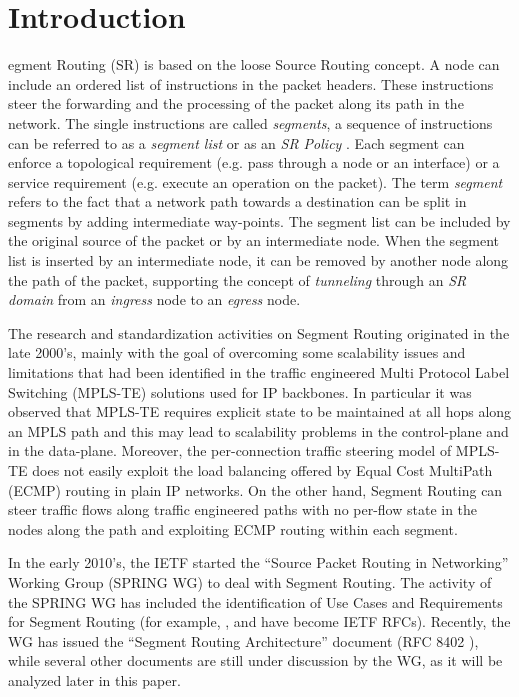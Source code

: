\section{Introduction}
\label{sec:intro}

egment Routing (SR) is based on the loose Source Routing concept. A node can include an ordered list of instructions in the packet headers. These instructions steer the forwarding and the processing of the packet along its path in the network. The single instructions are called \textit{segments}, a sequence of instructions can be referred to as a \textit{segment list} or as an \textit{SR Policy} . Each segment can enforce a topological requirement (e.g. pass through a node or an interface) or a service requirement (e.g. execute an operation on the packet). The term \textit{segment} refers to the fact that a network path towards a destination can be split in segments by adding intermediate way-points. The segment list can be included by the original source of the packet or by an intermediate node. When the segment list is inserted by an intermediate node, it can be removed by another node along the path of the packet, supporting the concept of \textit{tunneling} through an \textit{SR domain} from an \textit{ingress} node to an \textit{egress} node. 

The research and standardization activities on Segment Routing originated in the late 2000's, mainly with the goal of overcoming some scalability issues and limitations \cite{rfc5439} that had been identified in the traffic engineered Multi Protocol Label Switching (MPLS-TE) solutions used for IP backbones. In particular it was observed that MPLS-TE requires explicit state to be maintained at all hops along an MPLS path and this may lead to scalability problems in the control-plane and in the data-plane. Moreover, the per-connection traffic steering model of MPLS-TE does not easily exploit the load balancing offered by Equal Cost MultiPath (ECMP) routing in plain IP networks. On the other hand, Segment Routing can steer traffic flows along traffic engineered paths with no per-flow state in the nodes along the path and exploiting ECMP routing within each segment. 

In the early 2010's, the IETF started the ``Source Packet Routing in Networking'' Working Group (SPRING WG) to deal with Segment Routing. The activity of the SPRING WG has included the identification of Use Cases and Requirements for Segment Routing (for example, \cite{rfc7855}, \cite{rfc8355} and \cite{rfc8354} have become IETF RFCs). Recently, the WG has issued the ``Segment Routing Architecture'' document (RFC 8402 \cite{rfc8402}), while several other documents are still under discussion by the WG, as it will be analyzed later in this paper.

